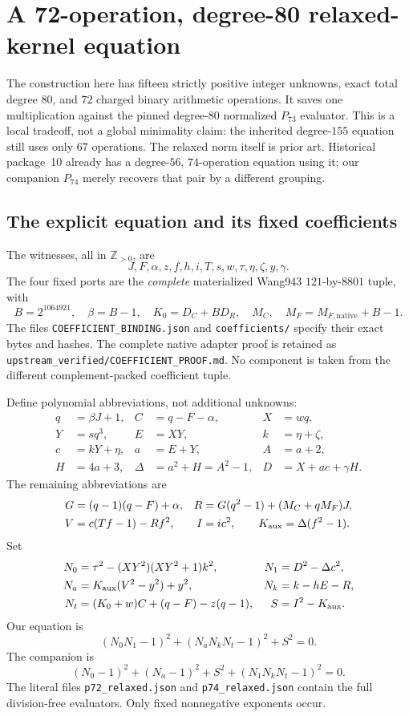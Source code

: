 \section{A 72-operation, degree-80 relaxed-kernel equation}
\label{sec:relaxed-short}

The construction here has fifteen strictly positive integer unknowns,
exact total degree $80$, and $72$ charged binary arithmetic operations.
It saves one multiplication against the pinned degree-$80$ normalized
$P_{73}$ evaluator. This is a local tradeoff, not a global minimality
claim: the inherited degree-$155$ equation still uses only $67$ operations.
The relaxed norm itself is prior art. Historical package~10 already has
a degree-$56$, $74$-operation equation using it; our companion $P_{74}$
merely recovers that pair by a different grouping.

\subsection{The explicit equation and its fixed coefficients}
The witnesses, all in $\mathbb Z_{>0}$, are
\[
 J,F,\alpha,z,f,h,i,T,s,w,\tau,\eta,\zeta,y,\gamma.
\]
The four fixed ports are the \emph{complete} materialized Wang943
$121$-by-$8801$ tuple, with
\[
 B=2^{1064921},\quad \beta=B-1,\quad
 K_0=D_C+BD_R,\quad M_C,\quad M_F=M_{F,\mathrm{native}}+B-1.
\]
The files \texttt{COEFFICIENT\_BINDING.json} and
\texttt{coefficients/} specify their exact bytes and hashes. The complete
native adapter proof is retained as
\texttt{upstream\_verified/COEFFICIENT\_PROOF.md}. No component is taken
from the different complement-packed coefficient tuple.

Define polynomial abbreviations, not additional unknowns:
\begin{align*}
 q&=\beta J+1,& C&=q-F-\alpha,& X&=wq,\\
 Y&=sq^3,&E&=XY,&k&=\eta+\zeta,\\
 c&=kY+\eta,&a&=E+Y,&A&=a+2,\\
 H&=4a+3,&\Delta&=a^2+H=A^2-1,&D&=X+ac+\gamma H.
\end{align*}
The remaining abbreviations are
\begin{align*}
 G&=(q-1)(q-F)+\alpha,&R&=G(q^2-1)+(M_C+qM_F)J,\\
 V&=c(Tf-1)-Rf^2,&I&=ic^2,\qquad K_{\rm aux}=\Delta(f^2-1).
\end{align*}
Set
\begin{align*}
 N_0&=\tau^2-(XY^2)(XY^2+1)k^2,&
 N_1&=D^2-\Delta c^2,\\
 N_a&=K_{\rm aux}(V^2-y^2)+y^2,&
 N_k&=k-hE-R,\\
 N_t&=(K_0+w)C+(q-F)-z(q-1),&
 S&=I^2-K_{\rm aux}.
\end{align*}
Our equation is
\begin{equation}\label{eq:relaxed72}
 \boxed{(N_0N_1-1)^2+(N_aN_kN_t-1)^2+S^2=0.}
\end{equation}
The companion is
\begin{equation}\label{eq:relaxed74}
 (N_0-1)^2+(N_a-1)^2+S^2+(N_1N_kN_t-1)^2=0.
\end{equation}
The literal files \texttt{p72\_relaxed.json} and
\texttt{p74\_relaxed.json} contain the full division-free evaluators.
Only fixed nonnegative exponents occur.

